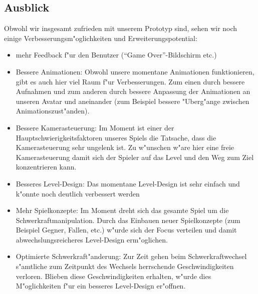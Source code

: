 \subsection{Ausblick}
\label{sec:results/future}
%
Obwohl wir insgesamt zufrieden mit unserem Prototyp sind, sehen wir noch einige
Verbesserungsm"oglichkeiten und Erweiterungspotential:

\begin{itemize}
	\item
		mehr Feedback f"ur den Benutzer (``Game Over''-Bildschirm etc.)
	\item Bessere Animationen: Obwohl unsere momentane Animationen funktionieren, gibt es auch hier viel
		Raum f"ur Verbesserungen. Zum einen durch bessere Aufnahmen und zum anderen durch bessere Anpassung
		der Animationen an unseren Avatar und aneinander (zum Beispiel bessere "Uberg"ange zwischen
		Animationszust"anden).
	\item Bessere Kamerasteuerung: Im Moment ist einer der Hauptschwierigkeitsfaktoren unseres Spiels die
		Tatsache, dass die Kamerasteuerung sehr ungelenk ist. Zu w"unschen w"are hier eine freie Kamerasteuerung
		damit sich der Spieler auf das Level und den Weg zum Ziel konzentrieren kann.
	\item Besseres Level-Design: Das momentane Level-Design ist sehr einfach und k"onnte noch deutlich
		verbessert werden
	\item Mehr Spielkonzepte: Im Moment dreht sich das gesamte Spiel um die Schwerkraftmanipulation.
		Durch das Einbauen neuer Spielkonzepte (zum Beispiel Gegner, Fallen, etc.) w"urde sich der Focus
		verteilen und damit abwechslungsreicheres Level-Design erm"oglichen.
	\item Optimierte Schwerkraft"anderung: Zur Zeit gehen beim Schwerkraftwechsel s"amtliche zum Zeitpunkt
		des Wechsels herrschende Geschwindigkeiten verloren. Blieben diese Geschwindigkeiten erhalten,
		w"urde dies M"oglichkeiten f"ur ein besseres Level-Design er"offnen.
\end{itemize}
